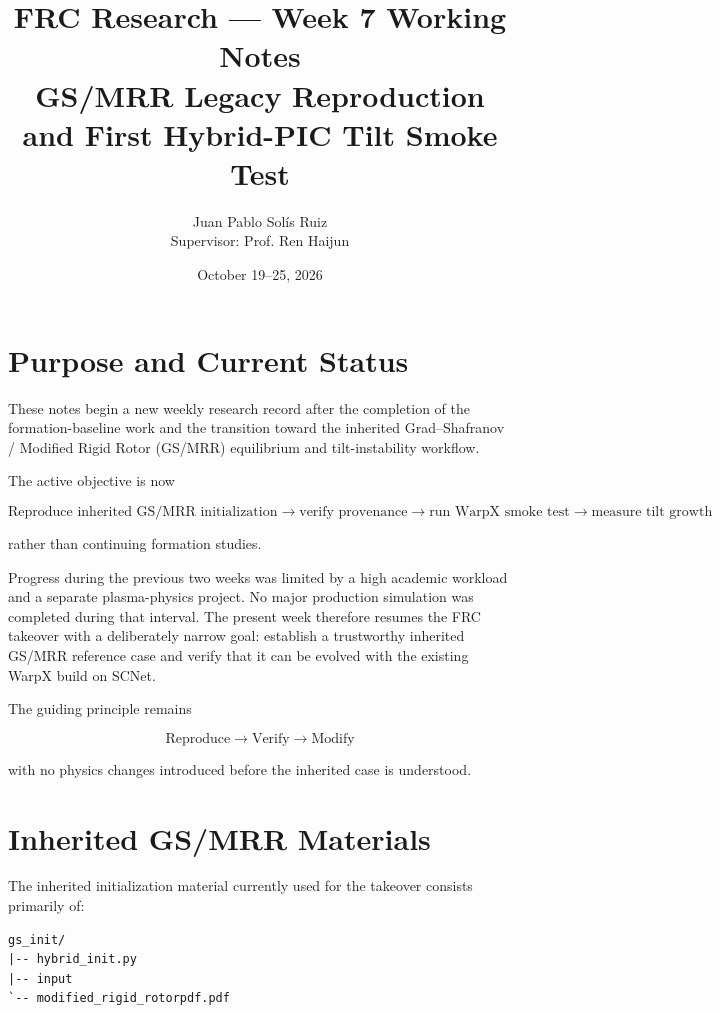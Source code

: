 \documentclass[11pt,a4paper]{article}
\title{\textbf{FRC Research --- Week 7 Working Notes}\\
\large GS/MRR Legacy Reproduction and First Hybrid-PIC Tilt Smoke Test}
\author{Juan Pablo Solís Ruiz\\
Supervisor: Prof. Ren Haijun}
\date{October 19--25, 2026}
\begin{document}
\maketitle
\tableofcontents
\newpage

\section{Purpose and Current Status}

These notes begin a new weekly research record after the completion of the
formation-baseline work and the transition toward the inherited
Grad--Shafranov / Modified Rigid Rotor (GS/MRR) equilibrium and tilt-instability
workflow.

The active objective is now

\[
\boxed{
\text{Reproduce inherited GS/MRR initialization}
\rightarrow
\text{verify provenance}
\rightarrow
\text{run WarpX smoke test}
\rightarrow
\text{measure tilt growth}
}
\]

rather than continuing formation studies.

Progress during the previous two weeks was limited by a high academic workload
and a separate plasma-physics project. No major production simulation was
completed during that interval. The present week therefore resumes the FRC
takeover with a deliberately narrow goal: establish a trustworthy inherited
GS/MRR reference case and verify that it can be evolved with the existing
WarpX build on SCNet.

The guiding principle remains

\[
\boxed{
\text{Reproduce} \rightarrow \text{Verify} \rightarrow \text{Modify}
}
\]

with no physics changes introduced before the inherited case is understood.

\section{Inherited GS/MRR Materials}

The inherited initialization material currently used for the takeover consists
primarily of:

\begin{lstlisting}
gs_init/
|-- hybrid_init.py
|-- input
`-- modified_rigid_rotorpdf.pdf
\end{lstlisting}
\end{document}
